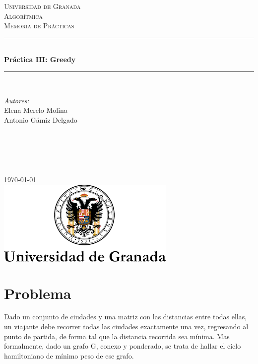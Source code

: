 \documentclass[11pt]{article}
\begin{document}
\begin{titlepage}
\newcommand{\HRule}{\rule{\linewidth}{0.5mm}}
\center
\textsc{\LARGE Universidad de Granada}\\[1.5cm] %
\textsc{\Large Algorítmica}\\[0.5cm] %
\textsc{\large Memoria de Prácticas}\\[0.5cm] %
\HRule \\[0.4cm]
{ \huge \bfseries Práctica III: Greedy}\\[0.4cm] %
\HRule \\[1.5cm]
\begin{minipage}{0.4\textwidth}
\begin{flushleft} \large
\emph{Autores:}\\
Elena Merelo Molina \\
Antonio Gámiz Delgado\textsc{} %
\end{flushleft}
\end{minipage}
~
\begin{minipage}{0.4\textwidth}
\begin{flushright} \large
\emph{} \\
\textsc{} %
\end{flushright}
\end{minipage}\\[2cm]
{\large \today}\\[2cm] %
\includegraphics{./logo.png}\\[1cm]
\vfill %
\end{titlepage}

\section{Problema}

Dado un conjunto de ciudades y una matriz con las distancias entre todas ellas, un viajante debe recorrer todas las ciudades exactamente una vez, regresando al punto de partida, de forma tal que la distancia recorrida sea mínima. Mas formalmente, dado un grafo G, conexo y ponderado, se trata de hallar el ciclo hamiltoniano de mínimo peso de ese grafo.
\end{document}
